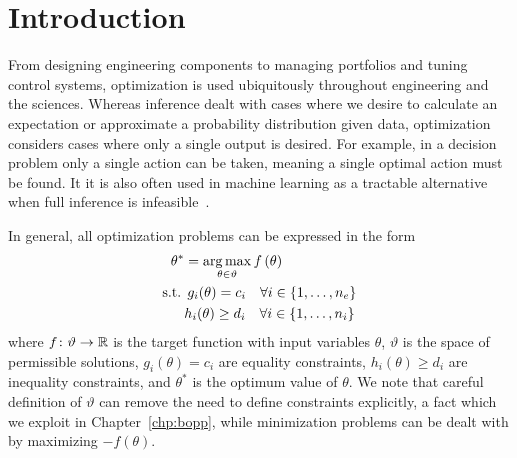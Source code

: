 
\section{Introduction}
\label{sec:opt:intro}

From designing engineering components to managing portfolios and tuning control systems,
optimization is used ubiquitously throughout engineering and the sciences.   Whereas inference
dealt with cases where we desire to calculate an expectation or approximate a probability distribution
given data, optimization considers cases where only a single output is desired.  For example, in
a decision problem only a single action can be taken, meaning a single optimal action must be
found.  It it is also often used in machine learning as a tractable alternative when full inference
is infeasible~\cite{murphy2012machine}.

In general, all optimization problems can be expressed in the form
\begin{align}
	\begin{split}
	\label{eq:opt:funcMax}
	\theta^* &= \operatorname*{arg\,max}_{\theta \in \vartheta} f\left(\theta\right) \\
	\text{s.t.} \: & \: g_i(\theta) = c_i \quad \forall i \in \{1,\dots,n_e\} \\
		 & h_i(\theta) \ge d_i \quad \forall i \in \{1,\dots,n_i\}
	\end{split}
\end{align}
where $f \colon \vartheta \rightarrow \mathbb{R}$ is the target function with input
variables $\theta$, $\vartheta$ is the space of permissible solutions, 
$g_i(\theta) = c_i$ are equality constraints, $h_i(\theta) \ge d_i$ are
inequality constraints, and $\theta^*$ is the optimum value of $\theta$.
We note that careful definition of $\vartheta$ can remove the need to
define constraints explicitly, a fact which we exploit in Chapter~\ref{chp:bopp},
while minimization problems can be dealt with by maximizing $-f\left(\theta\right)$.

